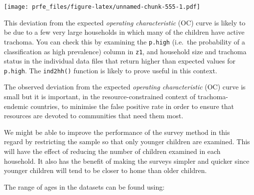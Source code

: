\documentclass[12pt,a4paper]{book}
\newenvironment{Shaded}{\begin{snugshade}}{\end{snugshade}}
\newcommand{\CharTok}[1]{\textcolor[rgb]{0.31,0.60,0.02}{#1}}
\newcommand{\ControlFlowTok}[1]{\textcolor[rgb]{0.13,0.29,0.53}{\textbf{#1}}}
\newcommand{\DataTypeTok}[1]{\textcolor[rgb]{0.13,0.29,0.53}{#1}}
\newcommand{\KeywordTok}[1]{\textcolor[rgb]{0.13,0.29,0.53}{\textbf{#1}}}
\newcommand{\NormalTok}[1]{#1}
\newcommand{\OperatorTok}[1]{\textcolor[rgb]{0.81,0.36,0.00}{\textbf{#1}}}
\newcommand{\OtherTok}[1]{\textcolor[rgb]{0.56,0.35,0.01}{#1}}
\newcommand{\StringTok}[1]{\textcolor[rgb]{0.31,0.60,0.02}{#1}}
\theoremstyle{definition}
\theoremstyle{definition}
\theoremstyle{definition}
\theoremstyle{remark}
\begin{document}
\texttt{[image: prfe\_files/figure-latex/unnamed-chunk-555-1.pdf]}

This deviation from the expected \emph{operating characteristic} (OC)
curve is likely to be due to a few very large households in which many
of the children have active trachoma. You can check this by examining
the \texttt{p.high} (i.e.~the probability of a classification as high
prevalence) column in \texttt{z1}, and household size and trachoma
status in the individual data files that return higher than expected
values for \texttt{p.high}. The \texttt{ind2hh()} function is likely to
prove useful in this context.

The observed deviation from the expected \emph{operating characteristic}
(OC) curve is small but it is important, in the resource-constrained
context of trachoma-endemic countries, to minimise the false positive
rate in order to ensure that resources are devoted to communities that
need them most.

We might be able to improve the performance of the survey method in this
regard by restricting the sample so that only younger children are
examined. This will have the effect of reducing the number of children
examined in each household. It also has the benefit of making the
surveys simpler and quicker since younger children will tend to be
closer to home than older children.

The range of ages in the datasets can be found using:

\begin{Shaded}
\end{Shaded}
\end{document}
